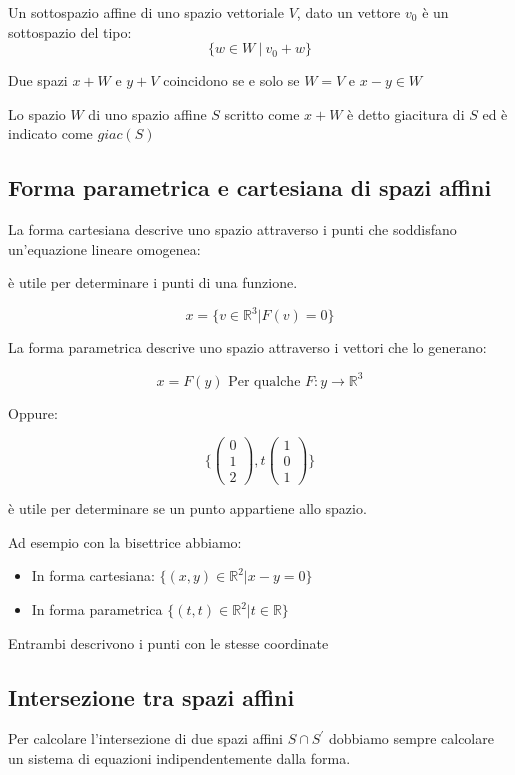 \documentclass[a4paper, 10pt]{article}
\begin{document}
Un sottospazio affine di uno spazio vettoriale $V$, dato un vettore $v_0$ è un sottospazio del tipo:
$$\{w \in W\ |\ v_0 + w\}$$

Due spazi $x+W$ e $y + V$ coincidono se e solo se $W=V$ e $x-y \in W$

Lo spazio $W$ di uno spazio affine $S$ scritto come $x+W$ è detto giacitura di $S$ ed è indicato come $giac(S)$
\subsection{Forma parametrica e cartesiana di spazi affini}

La forma cartesiana descrive uno spazio attraverso i punti che soddisfano un'equazione lineare omogenea:

è utile per determinare i punti di una funzione.

$$x=\{v\in\mathbb{R}^3|F(v)=0\}$$

La forma parametrica descrive uno spazio attraverso i vettori che lo generano:

$$x=F(y) \text{ Per qualche } F:y \rightarrow \mathbb{R}^3$$

Oppure:

$$\{\begin{pmatrix}
	0 \\
	1 \\
	2
\end{pmatrix}, t\begin{pmatrix}
1 \\
0 \\
1
\end{pmatrix}\}$$


è utile per determinare se un punto appartiene allo spazio.

Ad esempio con la bisettrice abbiamo:

\begin{itemize}
	\item In forma cartesiana: $\{(x,y) \in \mathbb{R}^2 | x-y = 0\}$
	\item In forma parametrica $\{(t,t) \in \mathbb{R}^2 | t \in \mathbb{R}\}$
\end{itemize}

Entrambi descrivono i punti con le stesse coordinate

\subsection{Intersezione tra spazi affini}

Per calcolare l'intersezione di due spazi affini $S \cap S^{'}$ dobbiamo sempre calcolare un sistema di equazioni indipendentemente dalla forma.
\end{document}
